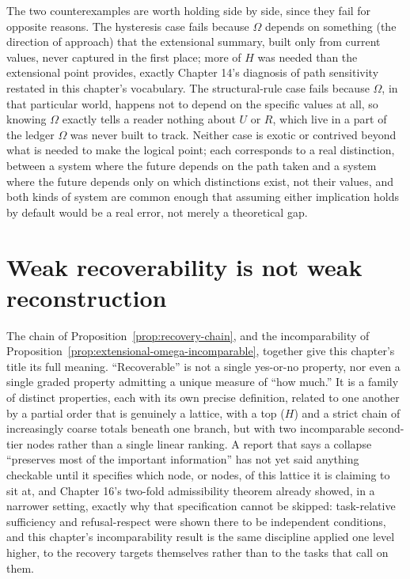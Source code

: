 \documentclass[11pt]{book}
\begin{document}
The two counterexamples are worth holding side by side, since they fail for opposite reasons. The hysteresis case fails because $\Omega$ depends on something (the direction of approach) that the extensional summary, built only from current values, never captured in the first place; more of $H$ was needed than the extensional point provides, exactly Chapter 14's diagnosis of path sensitivity restated in this chapter's vocabulary. The structural-rule case fails because $\Omega$, in that particular world, happens not to depend on the specific values at all, so knowing $\Omega$ exactly tells a reader nothing about $U$ or $R$, which live in a part of the ledger $\Omega$ was never built to track. Neither case is exotic or contrived beyond what is needed to make the logical point; each corresponds to a real distinction, between a system where the future depends on the path taken and a system where the future depends only on which distinctions exist, not their values, and both kinds of system are common enough that assuming either implication holds by default would be a real error, not merely a theoretical gap.

\section{Weak recoverability is not weak reconstruction}

The chain of Proposition~\ref{prop:recovery-chain}, and the incomparability of Proposition~\ref{prop:extensional-omega-incomparable}, together give this chapter's title its full meaning. ``Recoverable'' is not a single yes-or-no property, nor even a single graded property admitting a unique measure of ``how much.'' It is a family of distinct properties, each with its own precise definition, related to one another by a partial order that is genuinely a lattice, with a top ($H$) and a strict chain of increasingly coarse totals beneath one branch, but with two incomparable second-tier nodes rather than a single linear ranking. A report that says a collapse ``preserves most of the important information'' has not yet said anything checkable until it specifies which node, or nodes, of this lattice it is claiming to sit at, and Chapter 16's two-fold admissibility theorem already showed, in a narrower setting, exactly why that specification cannot be skipped: task-relative sufficiency and refusal-respect were shown there to be independent conditions, and this chapter's incomparability result is the same discipline applied one level higher, to the recovery targets themselves rather than to the tasks that call on them.
\end{document}
